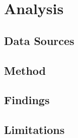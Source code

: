 \chapter{Analysis}
\label{ch:analysis}


\section{Data Sources}
\label{sec:analysis:sources}


\section{Method}
\label{sec:analysis:method}


\section{Findings}
\label{sec:analysis:findings}


\section{Limitations}
\label{sec:analysis:limitations}

